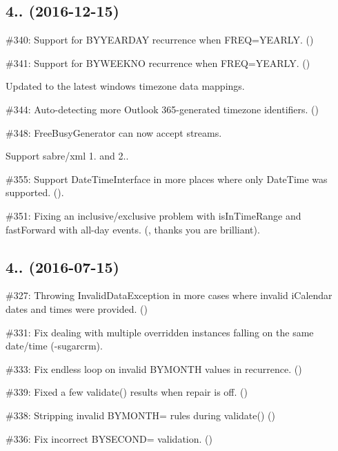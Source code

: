 \subsection*{4.. (2016-\/12-\/15) }


\begin{DoxyItemize}
\item \#340\+: Support for {\ttfamily B\+Y\+Y\+E\+A\+R\+D\+AY} recurrence when {\ttfamily F\+R\+EQ=Y\+E\+A\+R\+LY}. ()
\item \#341\+: Support for {\ttfamily B\+Y\+W\+E\+E\+K\+NO} recurrence when {\ttfamily F\+R\+EQ=Y\+E\+A\+R\+LY}. ()
\item Updated to the latest windows timezone data mappings.
\item \#344\+: Auto-\/detecting more Outlook 365-\/generated timezone identifiers. ()
\item \#348\+: {\ttfamily Free\+Busy\+Generator} can now accept streams.
\item Support sabre/xml 1. and 2..
\item \#355\+: Support {\ttfamily Date\+Time\+Interface} in more places where only {\ttfamily Date\+Time} was supported. ().
\item \#351\+: Fixing an inclusive/exclusive problem with {\ttfamily is\+In\+Time\+Range} and {\ttfamily fast\+Forward} with all-\/day events. (, thanks you are brilliant).
\end{DoxyItemize}

\subsection*{4.. (2016-\/07-\/15) }


\begin{DoxyItemize}
\item \#327\+: Throwing {\ttfamily Invalid\+Data\+Exception} in more cases where invalid i\+Calendar dates and times were provided. ()
\item \#331\+: Fix dealing with multiple overridden instances falling on the same date/time (-\/sugarcrm).
\item \#333\+: Fix endless loop on invalid {\ttfamily B\+Y\+M\+O\+N\+TH} values in recurrence. ()
\item \#339\+: Fixed a few {\ttfamily validate()} results when repair is off. ()
\item \#338\+: Stripping invalid {\ttfamily B\+Y\+M\+O\+N\+TH=} rules during {\ttfamily validate()} ()
\item \#336\+: Fix incorrect {\ttfamily B\+Y\+S\+E\+C\+O\+ND=} validation. ()
\end{DoxyItemize}

